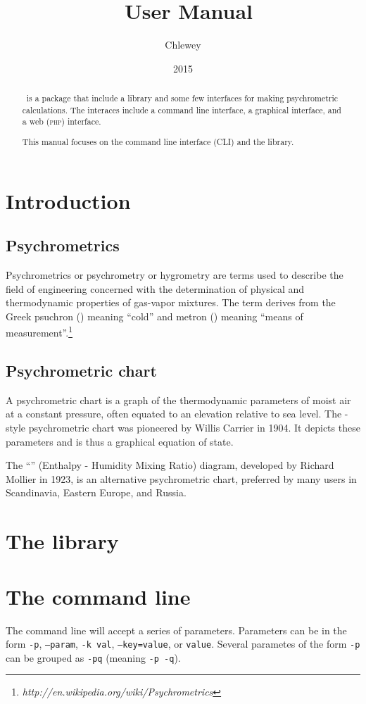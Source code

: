 \documentclass[letterpaper]{article}
\title{\psicret~User Manual}
\author{Chlewey}
\date{2015}
\begin{document}
\maketitle
\begin{abstract}
\psicret\ is a package that include a library and some few interfaces
for making psychrometric calculations.
The interaces include a command line interface, a graphical interface,
and a web (\textsc{php}) interface.

This manual focuses on the command line interface (CLI) and the library.
\end{abstract}
\tableofcontents
\section{Introduction}
\subsection{Psychrometrics}
Psychrometrics or psychrometry or hygrometry are terms used to describe
the field of engineering concerned with the determination of physical
and thermodynamic properties of gas-vapor mixtures. The term derives
from the Greek psuchron () meaning ``cold'' and metron
() meaning ``means of measurement''.\footnote{%
\textit{http://en.wikipedia.org/wiki/Psychrometrics}}
\subsection{Psychrometric chart}
A psychrometric chart is a graph of the thermodynamic parameters of
moist air at a constant pressure, often equated to an elevation relative
to sea level. The \ashrae-style psychrometric chart was pioneered by
Willis Carrier in 1904. It depicts these parameters and is thus a
graphical equation of state.

The ``\mollier'' (Enthalpy - Humidity Mixing Ratio) diagram,
developed by Richard Mollier in 1923, is an alternative psychrometric
chart, preferred by many users in Scandinavia, Eastern Europe, and
Russia.
\section{The library}
\section{The command line}
The command line will accept a series of parameters. Parameters can be 
in the form \texttt{-p}, \texttt{--param}, \texttt{-k val},
\texttt{--key=value}, or \texttt{value}. Several parametes of the form
\texttt{-p} can be grouped as \texttt{-pq} (meaning \texttt{-p -q}).
\end{document}
